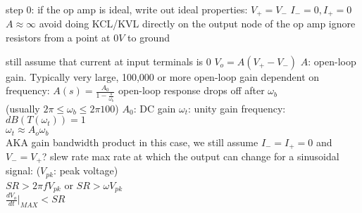 \documentclass[12pt]{article}
\begin{document}
\begin{spacing}{0.8}
\begin{multicols*}{2}
\begin{flushleft}
\begin{outline}[longenum]
	\1 step 0: if the op amp is ideal, write out ideal properties:
		\2 $V_+=V_-$
		\2 $I_-=0,I_+=0$
    \2 $A \approx \infty$
	\1 avoid doing KCL/KVL directly on the output node of the op amp
	\1 ignore resistors from a point at $0V$ to ground

  \1 still assume that current at input terminals is 0
  \1 $V_o = A (V_{+} - V_{-})$
    \2 $A$: open-loop gain. Typically very large, 100,000 or more
  \1 open-loop gain dependent on frequency: $A(s)=\frac{A_0}{1-\frac{s}{\omega_b}}$
    \2 open-loop response drops off after $\omega_b$
      \\(usually $2\pi \leq \omega_b \leq 2\pi100$)
    \2 $A_0$: DC gain
    \2 $\omega_t$: unity gain frequency: $dB(T(\omega_t))=1$
      \\ $\omega_t \approx A_o \omega_b$
      \\ AKA gain bandwidth product
    \2 in this case, we still assume $I_-=I_+=0$ and $V_-=V_+$?
  \1 slew rate
    \2 max rate at which the output can change
    \2 for a sinusoidal signal: ($V_{pk}$: peak voltage)
      \\ $SR > 2 \pi f V_{pk}$ or $SR > \omega V_{pk}$
      \\ $\frac{dV_o}{dt}|_{MAX} < SR$




\end{outline}
\end{flushleft}
\end{multicols*}
\end{spacing}
\end{document}
